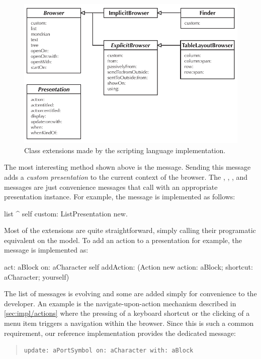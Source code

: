 \documentclass[a4paper,10pt,twoside]{book}
\begin{document}
\begin{figure}[htbp]
\centerline{\includegraphics[width=\linewidth]{script_extensions.pdf}}
\caption{Class extensions made by the scripting language implementation.}
\label{fig:uml-script_extensions}
\end{figure}

The most interesting method shown above is the  message. Sending this message adds a \emph{custom presentation} to the current context of the browser. The , , , and  messages are just convenience messages that call  with an appropriate presentation instance. For example, the  message is implemented as follows:

\begin{code}{}
list
	^ self custom: ListPresentation new.
\end{code}

Most of the extensions are quite straightforward, simply calling their programatic equivalent on the model. To add an action to a presentation for example, the  message is implemented as:

\begin{code}{}
act: aBlock on: aCharacter 
	self addAction: (Action new
		action: aBlock;
		shortcut: aCharacter;
		yourself)
\end{code}

The list of messages is evolving and some are added simply for convenience to the developer. An example is the navigate-upon-action mechanism described in \ref{sec:impl/actions} where the pressing of a keyboard shortcut or the clicking of a menu item triggers a navigation within the browser. Since this is such a common requirement, our reference implementation provides the dedicated message:
\begin{quotation}\noindent
\lstinline{update: aPortSymbol on: aCharacter with: aBlock}
\end{quotation}
\end{document}

